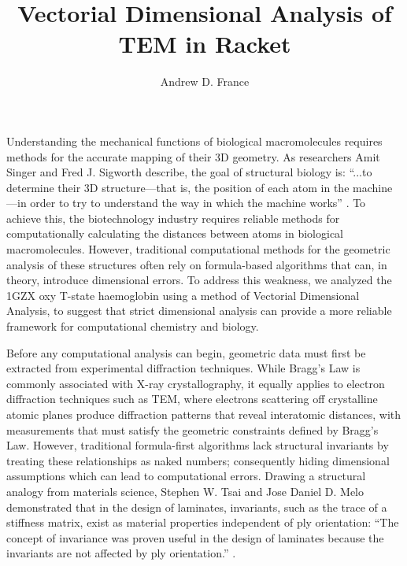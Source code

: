 \documentclass[man]{apa7}
\begin{document}
	\title{Vectorial Dimensional Analysis of TEM in Racket}
	\author{Andrew D. France}
	\maketitle
	Understanding the mechanical functions of biological macromolecules requires methods for the accurate mapping of their 3D geometry. As researchers Amit Singer and Fred J. Sigworth describe, the goal of structural biology is: ``...to determine their 3D structure—that is, the position of each atom in the machine—in order to try to understand the way in which the machine works'' \parencite{Singer2020}. To achieve this, the biotechnology industry requires reliable methods for computationally calculating the distances between atoms in biological macromolecules. However, traditional computational methods for the geometric analysis of these structures often rely on formula-based algorithms that can, in theory, introduce dimensional errors. To address this weakness, we analyzed the 1GZX oxy T-state haemoglobin \parencite{Paoli1996} using a method of Vectorial Dimensional Analysis, to suggest that strict dimensional analysis can provide a more reliable framework for computational chemistry and biology.
	
	Before any computational analysis can begin, geometric data must first be extracted from experimental diffraction techniques. While Bragg's Law is commonly associated with X-ray crystallography, it equally applies to electron diffraction techniques such as TEM, where electrons scattering off crystalline atomic planes produce diffraction patterns that reveal interatomic distances, with measurements that must satisfy the geometric constraints defined by Bragg's Law. However, traditional formula-first algorithms lack structural invariants by treating these relationships as naked numbers; consequently hiding dimensional assumptions which can lead to computational errors. Drawing a structural analogy from materials science, Stephen W. Tsai and Jose Daniel D. Melo demonstrated that in the design of laminates, invariants, such as the trace of a stiffness matrix, exist as material properties independent of ply orientation: ``The concept of invariance was proven useful in the design of laminates because the invariants are not affected by ply orientation.'' \parencite{Tsai2014}. 
	
\end{document}

